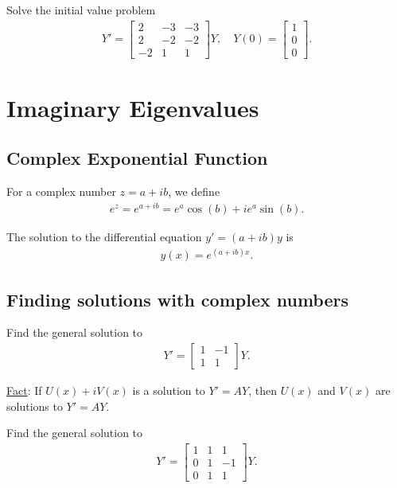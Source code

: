 \documentclass[12pt,a4paper]{article}
\newcounter{example}[section]
\begin{document}
	\begin{example}
	Solve the initial value problem
		\begin{align*}
		Y' = \begin{bmatrix}
		2 & -3 & -3 \\
		2 & -2 & -2 \\
		-2 & 1 & 1
		\end{bmatrix}Y , \quad Y(0) = \begin{bmatrix}
		1 \\ 0 \\ 0
		\end{bmatrix} .
		\end{align*}
	\end{example}
	
	\newpage
	
\section{Imaginary Eigenvalues}

	\subsection{Complex Exponential Function}
	For a complex number $z = a + ib$, we define
		\begin{align*}
		e^z = e^{a + ib} = e^a \cos (b) + i e^a \sin (b) .
		\end{align*}
		
	The solution to the differential equation $y' = (a + ib) y$ is
		\begin{align*}
		y (x) = e^{(a + ib)x} .
		\end{align*}
	
	\subsection{Finding solutions with complex numbers}
	
	\begin{example}
	Find the general solution to 
		\begin{align*}
		Y' = \begin{bmatrix}
		1 & -1 \\ 1 & 1
		\end{bmatrix} Y.
		\end{align*}
	\end{example}
	
	\newpage
	
	\phantom{p}
	
	\vfill
	
	\underline{Fact}: If $U(x) + i V(x)$ is a solution to $Y' = A Y$, then $U(x)$ and $V(x)$ are solutions to $Y' = A Y$.
	
	\newpage
	
	\begin{example}
	Find the general solution to
		\begin{align*}
		Y' = \begin{bmatrix}
		1 & 1 & 1 \\
		0 & 1 & -1 \\
		0 & 1 & 1
		\end{bmatrix} Y.
		\end{align*}
	\end{example}
\end{document}
